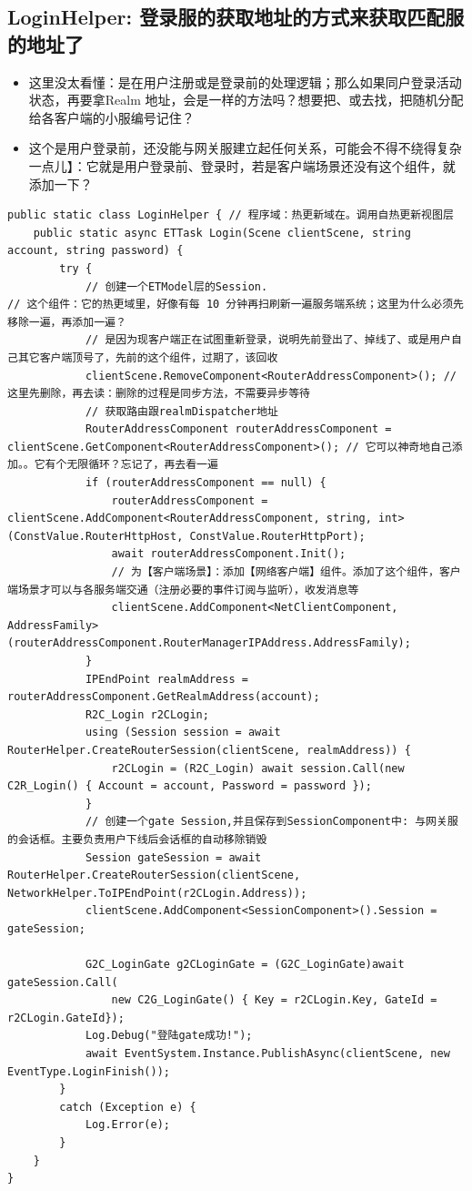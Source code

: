 \documentclass[9pt, b5paper]{article}
\begin{document}
\subsection{LoginHelper: 登录服的获取地址的方式来获取匹配服的地址了}
\label{sec-7-14}
\begin{itemize}
\item 这里没太看懂：是在用户注册或是登录前的处理逻辑；那么如果同户登录活动状态，再要拿Realm 地址，会是一样的方法吗？想要把、或去找，把随机分配给各客户端的小服编号记住？
\item 这个是用户登录前，还没能与网关服建立起任何关系，可能会不得不绕得复杂一点儿】：它就是用户登录前、登录时，若是客户端场景还没有这个组件，就添加一下？
\end{itemize}
\begin{verbatim}
public static class LoginHelper { // 程序域：热更新域在。调用自热更新视图层
    public static async ETTask Login(Scene clientScene, string account, string password) {
        try {
            // 创建一个ETModel层的Session.
// 这个组件：它的热更域里，好像有每 10 分钟再扫刷新一遍服务端系统；这里为什么必须先移除一遍，再添加一遍？
            // 是因为现客户端正在试图重新登录，说明先前登出了、掉线了、或是用户自己其它客户端顶号了，先前的这个组件，过期了，该回收
            clientScene.RemoveComponent<RouterAddressComponent>(); // 这里先删除，再去读：删除的过程是同步方法，不需要异步等待
            // 获取路由跟realmDispatcher地址
            RouterAddressComponent routerAddressComponent = clientScene.GetComponent<RouterAddressComponent>(); // 它可以神奇地自己添加。。它有个无限循环？忘记了，再去看一遍
            if (routerAddressComponent == null) {
                routerAddressComponent = clientScene.AddComponent<RouterAddressComponent, string, int>(ConstValue.RouterHttpHost, ConstValue.RouterHttpPort);
                await routerAddressComponent.Init();
                // 为【客户端场景】：添加【网络客户端】组件。添加了这个组件，客户端场景才可以与各服务端交通（注册必要的事件订阅与监听），收发消息等
                clientScene.AddComponent<NetClientComponent, AddressFamily>(routerAddressComponent.RouterManagerIPAddress.AddressFamily);
            }
            IPEndPoint realmAddress = routerAddressComponent.GetRealmAddress(account);
            R2C_Login r2CLogin;
            using (Session session = await RouterHelper.CreateRouterSession(clientScene, realmAddress)) {
                r2CLogin = (R2C_Login) await session.Call(new C2R_Login() { Account = account, Password = password });
            }
            // 创建一个gate Session,并且保存到SessionComponent中: 与网关服的会话框。主要负责用户下线后会话框的自动移除销毁
            Session gateSession = await RouterHelper.CreateRouterSession(clientScene, NetworkHelper.ToIPEndPoint(r2CLogin.Address));
            clientScene.AddComponent<SessionComponent>().Session = gateSession;

            G2C_LoginGate g2CLoginGate = (G2C_LoginGate)await gateSession.Call(
                new C2G_LoginGate() { Key = r2CLogin.Key, GateId = r2CLogin.GateId});
            Log.Debug("登陆gate成功!");
            await EventSystem.Instance.PublishAsync(clientScene, new EventType.LoginFinish());
        }
        catch (Exception e) {
            Log.Error(e);
        }
    } 
}
\end{verbatim}
\end{document}
